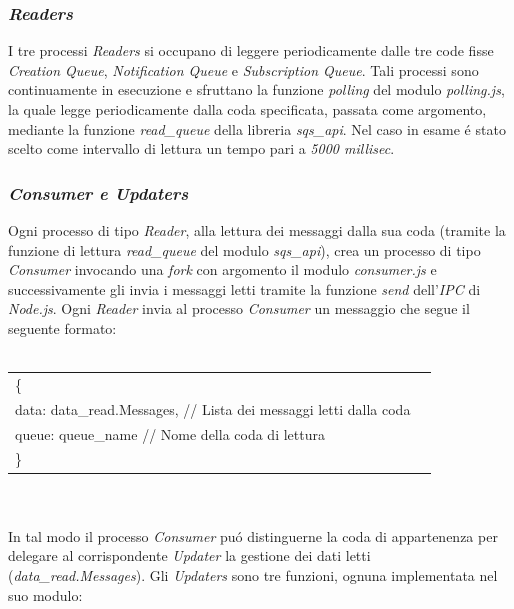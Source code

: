 \documentclass{article}
\begin{document}
\subsubsection{\textit{Readers}}
I tre processi \textit{Readers} si occupano di leggere periodicamente dalle tre code fisse \textit{Creation Queue}, \textit{Notification Queue} e \textit{Subscription Queue}. Tali processi sono continuamente in esecuzione e sfruttano la funzione \textit{polling} del modulo \textit{polling.js}, la quale legge periodicamente dalla coda specificata, passata come argomento, mediante la funzione \textit{read\_queue} della libreria \textit{sqs\_api}. Nel caso in esame \'e stato scelto come intervallo di lettura un tempo pari a \textit{5000 millisec}.

\subsubsection{\textit{Consumer e Updaters}}
Ogni processo di tipo \textit{Reader}, alla lettura dei messaggi dalla sua coda (tramite la funzione di lettura \textit{read\_queue} del modulo \textit{sqs\_api}), crea un processo di tipo \textit{Consumer} invocando una \textit{fork} con argomento il modulo \textit{consumer.js} e successivamente gli invia i messaggi letti tramite la funzione \textit{send} dell'\textit{IPC} di \textit{Node.js}. Ogni \textit{Reader} invia al processo \textit{Consumer} un messaggio che segue il seguente formato:
\\\\
\begin{tabular}{ll}
\{\\	   
           \hspace{10mm} data: data\_read.Messages, // Lista dei messaggi letti dalla coda \\
           \hspace{10mm} queue: queue\_name // Nome della coda di lettura
\\
\}
\end{tabular}
\\\\
In tal modo il processo \textit{Consumer} pu\'o distinguerne la coda di appartenenza per delegare al corrispondente \textit{Updater} la gestione dei dati letti (\textit{data\_read.Messages}). Gli \textit{Updaters} sono tre funzioni, ognuna implementata nel suo modulo:
\end{document}
